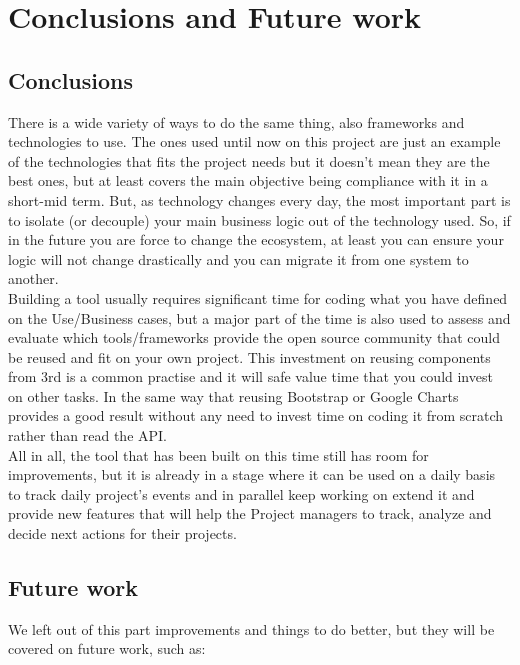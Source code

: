 \part{Conclusions and Future work}



\chapter{Conclusions}
There is a wide variety of ways to do the same thing, also frameworks and
technologies to use. The ones used until now on this project are just an example
of the technologies that fits the project needs but it doesn't mean they are the best
ones, but at least covers the main objective being compliance with it in a
short-mid term. But, as technology changes every day, the most important part is
to isolate (or decouple) your main business logic out of the technology used.
So, if in the future you are force to change the ecosystem, at least you can ensure your
logic will not change drastically and you can migrate it from one system to
another.\\

Building a tool usually requires significant time for coding what you have
defined on the Use/Business cases, but a major part of the time is also used to
assess and evaluate which tools/frameworks provide the open source community
that could be reused and fit on your own project. This investment on reusing
components from 3rd is a common practise and it will safe value time that you
could invest on other tasks. 
In the same way that reusing Bootstrap or Google
Charts provides a good result without any need to invest time on coding it from
scratch rather than read the API.\\

All in all, the tool that has been built on this time still has room for
improvements, but it is already in a stage where it can be used on a daily basis
to track daily project's events and in parallel keep working on extend it and
provide new features that will help the Project managers to track, analyze and
decide next actions for their projects.

\chapter{Future work}
We left out of this part improvements and things to do better, but they will be
covered on future work, such as:


